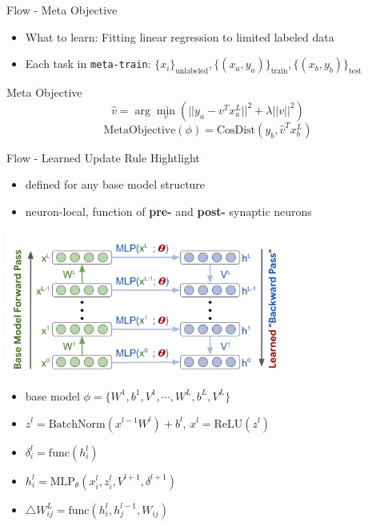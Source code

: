 \documentclass{beamer}
\begin{document}
\begin{frame}{Flow - Meta Objective}
  \begin{itemize}
    \item What to learn: Fitting linear regression to limited labeled data 
    \item Each task in \texttt{meta-train}: $\lbrace x_i \rbrace_{\text{unlabeled}}, \lbrace (x_a,y_a) \rbrace_\text{train}, \lbrace (x_b,y_b) \rbrace_\text{test}$
  \end{itemize}
  
  \begin{block}{Meta Objective}
    \[ \hat{v} = \arg \min_v (||y_a - v^Tx_a^L||^2 + \lambda ||v||^2) \]
    \[ \text{MetaObjective}(\phi) = \text{CosDist}(y_b,\hat{v}^Tx_b^L) \]
  \end{block}
  
\end{frame}

\begin{frame}{Flow - Learned Update Rule}
  Hightlight
  \begin{itemize}
    \item defined for any base model structure
    \item neuron-local, function of \textbf{pre-} and \textbf{post-} synaptic neurons
  \end{itemize}
\end{frame}

\begin{frame}
  \center \includegraphics[width=0.7\textwidth]{fig/update-rule.png}
  \begin{itemize}
    \item base model $\phi = \lbrace W^1,b^1,V^1,\cdots,W^L,b^L,V^L \rbrace$
    \item $z^l = \text{BatchNorm}(x^{l-1}W^l) + b^l$, $x^l = \text{ReLU}(z^l)$
    \item $\delta_i^l = \text{func}(h_i^l)$
    \item $h_i^l = \text{MLP}_\theta(x^l_i,z_i^l,V^{l+1},\delta^{l+1})$
    \item $\triangle W_{ij}^L = \text{func}(h_i^l,h_j^{l-1}, W_{ij})$
  \end{itemize}
\end{frame}
\end{document}
